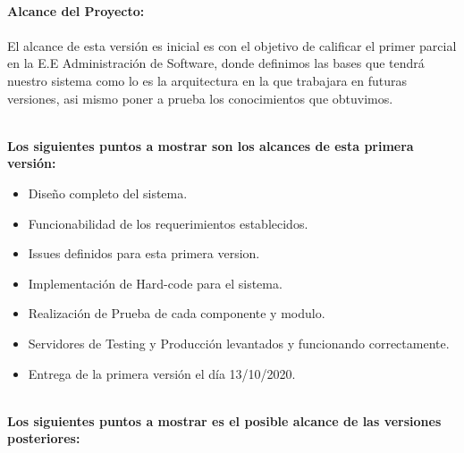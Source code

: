 \documentclass[40pt]{article}
\begin{document}
\maketitle
\textsf{\ \\
\textbf{Alcance del Proyecto:} \\
\\
El alcance de esta versión es inicial es con el objetivo de calificar el primer parcial en la E.E Administración de Software, donde definimos las bases que tendrá nuestro sistema como lo es la arquitectura en la que trabajara en futuras versiones, asi mismo poner a prueba los conocimientos que obtuvimos. \\}

\maketitle
\textsf{\ \\
\textbf{Los siguientes puntos a mostrar son los alcances de esta primera versión:} \\}

\begin{itemize}
    \item Diseño completo del sistema.
    \item Funcionabilidad de los requerimientos establecidos.
    \item Issues definidos para esta primera version.
    \item Implementación de Hard-code para el sistema.
    \item Realización de Prueba de cada componente y modulo.
    \item Servidores de Testing y Producción levantados y funcionando correctamente.
    \item Entrega de la primera versión el día 13/10/2020.
\end{itemize}

\maketitle
\textsf{\ \\
\textbf{Los siguientes puntos a mostrar es el posible alcance de las versiones posteriores:} \\}
\end{document}
